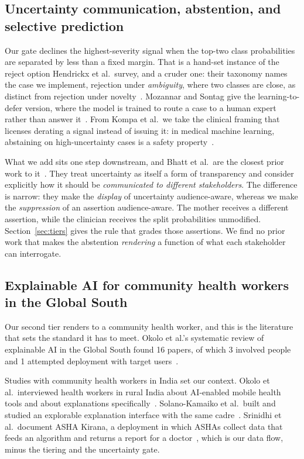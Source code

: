 \subsection{Uncertainty communication, abstention, and selective prediction}
\label{sec:rw-uncertainty}

Our gate declines the highest-severity signal when the top-two class
probabilities are separated by less than a fixed margin. That is a hand-set
instance of the reject option Hendrickx et al.\ survey, and a cruder one:
their taxonomy names the case we implement, rejection under \emph{ambiguity},
where two classes are close, as distinct from rejection under
novelty~\citep{hendrickx2024reject}. Mozannar and Sontag give the
learning-to-defer version, where the model is trained to route a case to a
human expert rather than answer it~\citep{mozannar2020consistent}. From Kompa
et al.\ we take the clinical framing that licenses derating a signal instead
of issuing it: in medical machine learning, abstaining on high-uncertainty
cases is a safety property~\citep{kompa2021second}.

What we add sits one step downstream, and Bhatt et al.\ are the closest prior
work to it~\citep{bhatt2021uncertainty}. They treat uncertainty as itself a
form of transparency and consider explicitly how it should be
\emph{communicated to different stakeholders}. The difference is narrow: they
make the \emph{display} of uncertainty audience-aware, whereas we make the
\emph{suppression} of an assertion audience-aware. The mother receives a
different assertion, while the clinician receives the split probabilities
unmodified. Section~\ref{sec:tiers} gives the rule that grades those
assertions. We find no prior work that makes the abstention \emph{rendering} a
function of what each stakeholder can interrogate.

\subsection{Explainable AI for community health workers in the Global South}
\label{sec:rw-chw}

Our second tier renders to a community health worker, and this is the
literature that sets the standard it has to meet. Okolo et al.'s systematic
review of explainable AI in the Global South found 16 papers, of which 3
involved people and 1 attempted deployment with target
users~\citep{okolo2022makingai}.

Studies with community health workers in India set our context. Okolo et al.\
interviewed health workers in rural India about AI-enabled mobile health tools and about
explanations specifically~\citep{okolo2021cannot,okolo2024easy}.
Solano-Kamaiko et al.\ built and studied an explorable explanation interface
with the same cadre~\citep{solanokamaiko2024explorable}. Srinidhi et al.\
document ASHA Kirana, a deployment in which ASHAs collect data that feeds an
algorithm and returns a report for a doctor~\citep{srinidhi2021asha}, which is
our data flow, minus the tiering and the uncertainty gate.

